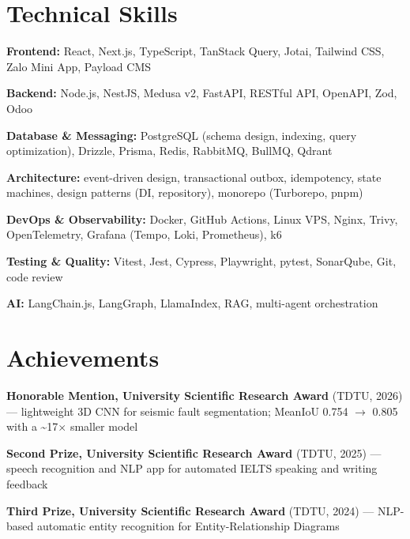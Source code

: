 \section{Technical Skills}
\begin{onecolentry}
\begin{highlights}
    \item \textbf{Frontend:} React, Next.js, TypeScript, TanStack Query, Jotai, Tailwind CSS, Zalo Mini App, Payload CMS
    \item \textbf{Backend:} Node.js, NestJS, Medusa v2, FastAPI, RESTful API, OpenAPI, Zod, Odoo
    \item \textbf{Database \& Messaging:} PostgreSQL (schema design, indexing, query optimization), Drizzle, Prisma, Redis, RabbitMQ, BullMQ, Qdrant
    \item \textbf{Architecture:} event-driven design, transactional outbox, idempotency, state machines, design patterns (DI, repository), monorepo (Turborepo, pnpm)
    \item \textbf{DevOps \& Observability:} Docker, GitHub Actions, Linux VPS, Nginx, Trivy, OpenTelemetry, Grafana (Tempo, Loki, Prometheus), k6
    \item \textbf{Testing \& Quality:} Vitest, Jest, Cypress, Playwright, pytest, SonarQube, Git, code review
    \item \textbf{AI:} LangChain.js, LangGraph, LlamaIndex, RAG, multi-agent orchestration
\end{highlights}
\end{onecolentry}

\section{Achievements}
\begin{onecolentry}
    \begin{highlights}
        \item \textbf{Honorable Mention, University Scientific Research Award} (TDTU, 2026) --- lightweight 3D CNN for seismic fault segmentation; MeanIoU 0.754 $\rightarrow$ 0.805 with a \textasciitilde17$\times$ smaller model
        \item \textbf{Second Prize, University Scientific Research Award} (TDTU, 2025) --- speech recognition and NLP app for automated IELTS speaking and writing feedback
        \item \textbf{Third Prize, University Scientific Research Award} (TDTU, 2024) --- NLP-based automatic entity recognition for Entity-Relationship Diagrams
    \end{highlights}
\end{onecolentry}

